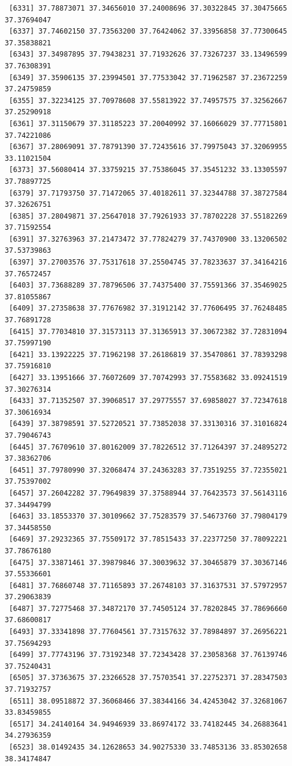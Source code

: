 \documentclass[
  letterpaper,
  DIV=11,
  numbers=noendperiod]{scrartcl}
\begin{document}
\begin{verbatim}
 [6331] 37.78873071 37.34656010 37.24008696 37.30322845 37.30475665 37.37694047
 [6337] 37.74602150 37.73563200 37.76424062 37.33956858 37.77300645 37.35838821
 [6343] 37.34987895 37.79438231 37.71932626 37.73267237 33.13496599 37.76308391
 [6349] 37.35906135 37.23994501 37.77533042 37.71962587 37.23672259 37.24759859
 [6355] 37.32234125 37.70978608 37.55813922 37.74957575 37.32562667 37.25290918
 [6361] 37.31150679 37.31185223 37.20040992 37.16066029 37.77715801 37.74221086
 [6367] 37.28069091 37.78791390 37.72435616 37.79975043 37.32069955 33.11021504
 [6373] 37.56080414 37.33759215 37.75386045 37.35451232 33.13305597 37.78897725
 [6379] 37.71793750 37.71472065 37.40182611 37.32344788 37.38727584 37.32626751
 [6385] 37.28049871 37.25647018 37.79261933 37.78702228 37.55182269 37.71592554
 [6391] 37.32763963 37.21473472 37.77824279 37.74370900 33.13206502 37.53739863
 [6397] 37.27003576 37.75317618 37.25504745 37.78233637 37.34164216 37.76572457
 [6403] 37.73688289 37.78796506 37.74375400 37.75591366 37.35469025 37.81055867
 [6409] 37.27358638 37.77676982 37.31912142 37.77606495 37.76248485 37.76891728
 [6415] 37.77034810 37.31573113 37.31365913 37.30672382 37.72831094 37.75997190
 [6421] 33.13922225 37.71962198 37.26186819 37.35470861 37.78393298 37.75916810
 [6427] 33.13951666 37.76072609 37.70742993 37.75583682 33.09241519 37.30276314
 [6433] 37.71352507 37.39068517 37.29775557 37.69858027 37.72347618 37.30616934
 [6439] 37.38798591 37.52720521 37.73852038 37.33130316 37.31016824 37.79046743
 [6445] 37.76709610 37.80162009 37.78226512 37.71264397 37.24895272 37.38362706
 [6451] 37.79780990 37.32068474 37.24363283 37.73519255 37.72355021 37.75397002
 [6457] 37.26042282 37.79649839 37.37588944 37.76423573 37.56143116 37.34494799
 [6463] 33.18553370 37.30109662 37.75283579 37.54673760 37.79804179 37.34458550
 [6469] 37.29232365 37.75509172 37.78515433 37.22377250 37.78092221 37.78676180
 [6475] 37.33871461 37.39879846 37.30039632 37.30465879 37.30367146 37.55336601
 [6481] 37.76860748 37.71165893 37.26748103 37.31637531 37.57972957 37.29063839
 [6487] 37.72775468 37.34872170 37.74505124 37.78202845 37.78696660 37.68600817
 [6493] 37.33341898 37.77604561 37.73157632 37.78984897 37.26956221 37.75694293
 [6499] 37.77743196 37.73192348 37.72343428 37.23058368 37.76139746 37.75240431
 [6505] 37.37363675 37.23266528 37.75703541 37.22752371 37.28347503 37.71932757
 [6511] 38.09518872 37.36068466 37.38344166 34.42453042 37.32681067 33.83459855
 [6517] 34.24140164 34.94946939 33.86974172 33.74182445 34.26883641 34.27936359
 [6523] 38.01492435 34.12628653 34.90275330 33.74853136 33.85302658 38.34174847

\end{verbatim}
\end{document}
